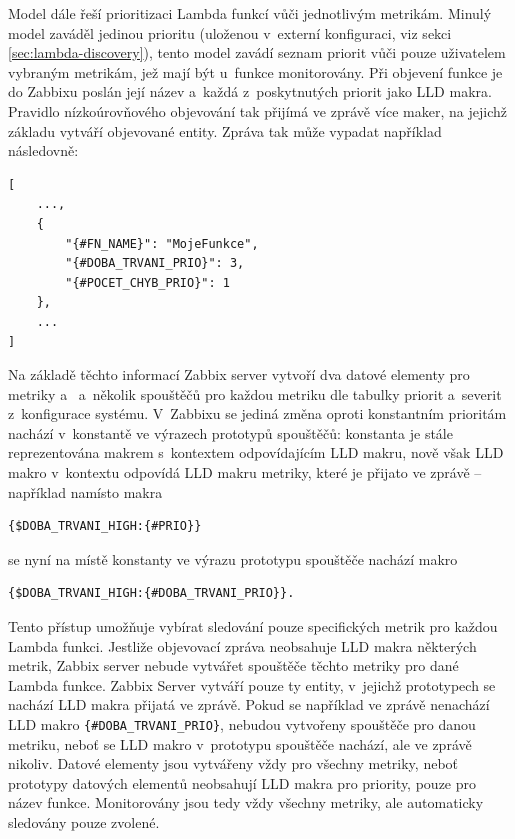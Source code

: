\documentclass[czech, ing, kiv, he, iso690]{fasthesis}
\begin{document}
Model  dále řeší prioritizaci Lambda funkcí vůči jednotlivým metrikám. Minulý model zaváděl jedinou prioritu (uloženou v~externí konfiguraci, viz sekci \ref{sec:lambda-discovery}), tento model zavádí seznam priorit vůči pouze uživatelem vybraným metrikám, jež mají být u~funkce monitorovány. Při objevení funkce je do Zabbixu poslán její název a~každá z~poskytnutých priorit jako LLD makra. Pravidlo nízkoúrovňového objevování tak přijímá ve zprávě více maker, na jejichž základu vytváří objevované entity. Zpráva tak může vypadat například následovně:

\begin{verbatim}
[
    ...,
    {
        "{#FN_NAME}": "MojeFunkce",
        "{#DOBA_TRVANI_PRIO}": 3,
        "{#POCET_CHYB_PRIO}": 1
    },
    ...
]
\end{verbatim}

Na základě těchto informací Zabbix server vytvoří dva datové elementy pro metriky  a~ a~několik spouštěčů pro každou metriku dle tabulky priorit a~severit z~konfigurace systému. V~Zabbixu se jediná změna oproti konstantním prioritám nachází v~konstantě ve výrazech prototypů spouštěčů: konstanta je stále reprezentována makrem s~kontextem odpovídajícím LLD makru, nově však LLD makro v~kontextu odpovídá LLD makru metriky, které je přijato ve zprávě -- například namísto makra

\begin{verbatim}
{$DOBA_TRVANI_HIGH:{#PRIO}}
\end{verbatim}
se nyní na místě konstanty ve výrazu prototypu spouštěče nachází makro

\begin{verbatim}
{$DOBA_TRVANI_HIGH:{#DOBA_TRVANI_PRIO}}.
\end{verbatim}

Tento přístup umožňuje vybírat sledování pouze specifických metrik pro každou Lambda funkci. Jestliže objevovací zpráva neobsahuje LLD makra některých metrik, Zabbix server nebude vytvářet spouštěče těchto metriky pro dané Lambda funkce. Zabbix Server vytváří pouze ty entity, v~jejichž prototypech se nachází LLD makra přijatá ve zprávě. Pokud se například ve zprávě nenachází LLD makro \verb|{#DOBA_TRVANI_PRIO}|, nebudou vytvořeny spouštěče pro danou metriku, neboť se LLD makro v~prototypu spouštěče nachází, ale ve zprávě nikoliv. Datové elementy jsou vytvářeny vždy pro všechny metriky, neboť prototypy datových elementů neobsahují LLD makra pro priority, pouze pro název funkce. Monitorovány jsou tedy vždy všechny metriky, ale automaticky sledovány pouze zvolené.
\end{document}
